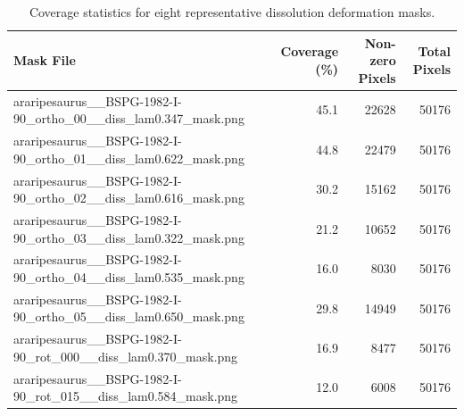 \begin{table}[htbp]
\caption{Coverage statistics for eight representative dissolution deformation masks.}
\label{tab:dissolution_masks}
\begin{tabular}{lrrr}
\toprule
Mask File & Coverage (\%) & Non-zero Pixels & Total Pixels \\
\midrule
araripesaurus\_\_BSPG-1982-I-90\_ortho\_00\_\_diss\_lam0.347\_mask.png & 45.1 & 22628 & 50176 \\
araripesaurus\_\_BSPG-1982-I-90\_ortho\_01\_\_diss\_lam0.622\_mask.png & 44.8 & 22479 & 50176 \\
araripesaurus\_\_BSPG-1982-I-90\_ortho\_02\_\_diss\_lam0.616\_mask.png & 30.2 & 15162 & 50176 \\
araripesaurus\_\_BSPG-1982-I-90\_ortho\_03\_\_diss\_lam0.322\_mask.png & 21.2 & 10652 & 50176 \\
araripesaurus\_\_BSPG-1982-I-90\_ortho\_04\_\_diss\_lam0.535\_mask.png & 16.0 & 8030 & 50176 \\
araripesaurus\_\_BSPG-1982-I-90\_ortho\_05\_\_diss\_lam0.650\_mask.png & 29.8 & 14949 & 50176 \\
araripesaurus\_\_BSPG-1982-I-90\_rot\_000\_\_diss\_lam0.370\_mask.png & 16.9 & 8477 & 50176 \\
araripesaurus\_\_BSPG-1982-I-90\_rot\_015\_\_diss\_lam0.584\_mask.png & 12.0 & 6008 & 50176 \\
\bottomrule
\end{tabular}
\end{table}
